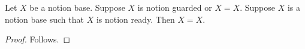 

\begin{proposition}\label{notion_completed_disjunction}
    Let $X$ be a notion base.
    Suppose $X$ is notion guarded or $X=X$.
    Suppose $X$ is a notion base such that $X$ is notion ready.
    Then $X=X$.
\end{proposition}
\begin{proof}
    Follows.
\end{proof}
